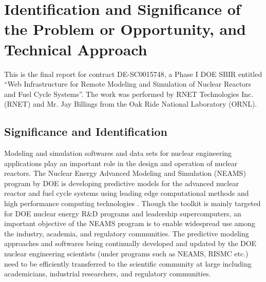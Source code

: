 \section{Identification and Significance of the Problem or Opportunity, and Technical Approach}

This is the final report for contract DE-SC0015748, a Phase I DOE SBIR
entitled ``Web Infrastructure for Remote Modeling and Simulation of Nuclear 
Reactors and Fuel Cycle Systems''. The work was performed by RNET Technologies 
Inc. (RNET) and Mr. Jay Billings from the Oak Ride National Laboratory (ORNL).

\subsection{Significance and Identification}
\label{intro} 
Modeling and simulation softwares and data sets for nuclear engineering 
applications play an important role in 
the design and operation of nuclear reactors. The Nuclear Energy Advanced 
Modeling and Simulation (NEAMS) program 
by DOE is developing predictive models for the advanced nuclear reactor and 
fuel cycle systems using leading edge 
computational methods and high performance computing technologies \cite{NEAMS}. 
Though the toolkit is mainly targeted 
for DOE nuclear energy R\&D programs and leadership supercomputers, an 
important objective of the NEAMS program is 
to enable widespread use among the industry, academia, and regulatory 
communities\cite{NEAMS}. The predictive 
modeling approaches and softwares being continually developed and updated by 
the DOE nuclear engineering scientists 
(under programs such as NEAMS, RISMC etc.) need to be efficiently transferred 
to the scientific community at large 
including academicians, industrial researchers, and regulatory communities. 

